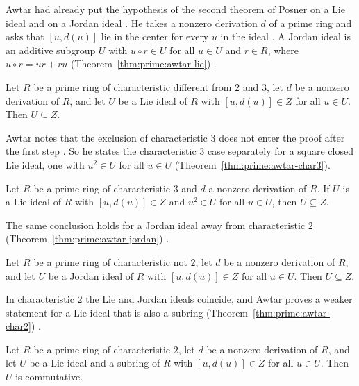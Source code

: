 Awtar had already put the hypothesis of the second theorem of Posner on a Lie ideal
and on a Jordan ideal \cite[p.~67]{Awtar1973}. He takes a nonzero derivation $d$ of
a prime ring and asks that $[u,d(u)]$ lie in the center for every $u$ in the ideal
\cite[p.~68]{Awtar1973}. A Jordan ideal is an additive subgroup $U$ with
$u\circ r\in U$ for all $u\in U$ and $r\in R$, where $u\circ r=ur+ru$ (Theorem~\ref{thm:prime:awtar-lie})
\cite[p.~71]{Awtar1973}.\begin{theorem}\label{thm:prime:awtar-lie}
Let $R$ be a prime ring of characteristic different from $2$ and $3$, let $d$ be
a nonzero derivation of $R$, and let $U$ be a Lie ideal of $R$ with $[u,d(u)]\in Z$
for all $u\in U$. Then $U\subseteq Z$.
\end{theorem}

Awtar notes that the exclusion of characteristic $3$ does not enter the proof after
the first step \cite[p.~71]{Awtar1973}. So he states the characteristic $3$ case
separately for a square closed Lie ideal, one with $u^{2}\in U$ for all $u\in U$ (Theorem~\ref{thm:prime:awtar-char3}).

\begin{theorem}\label{thm:prime:awtar-char3}
Let $R$ be a prime ring of characteristic $3$ and $d$ a nonzero derivation of $R$.
If $U$ is a Lie ideal of $R$ with $[u,d(u)]\in Z$ and $u^{2}\in U$ for all $u\in U$,
then $U\subseteq Z$.
\end{theorem}

The same conclusion holds for a Jordan ideal away from characteristic $2$ (Theorem~\ref{thm:prime:awtar-jordan})
\cite[p.~71]{Awtar1973}.\begin{theorem}\label{thm:prime:awtar-jordan}
Let $R$ be a prime ring of characteristic not $2$, let $d$ be a nonzero derivation
of $R$, and let $U$ be a Jordan ideal of $R$ with $[u,d(u)]\in Z$ for all $u\in U$.
Then $U\subseteq Z$.
\end{theorem}

In characteristic $2$ the Lie and Jordan ideals coincide, and Awtar proves a weaker
statement for a Lie ideal that is also a subring (Theorem~\ref{thm:prime:awtar-char2}) \cite[p.~72]{Awtar1973}.

\begin{theorem}\label{thm:prime:awtar-char2}
Let $R$ be a prime ring of characteristic $2$, let $d$ be a nonzero derivation of
$R$, and let $U$ be a Lie ideal and a subring of $R$ with $[u,d(u)]\in Z$ for all
$u\in U$. Then $U$ is commutative.
\end{theorem}

